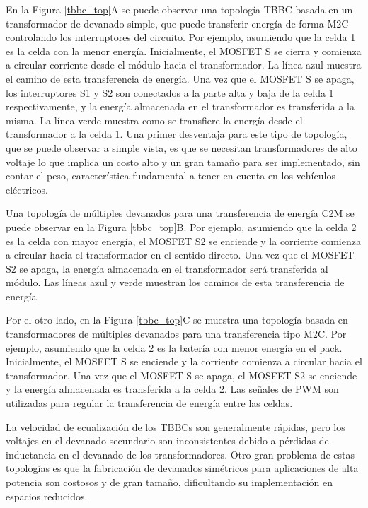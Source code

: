 En la Figura \ref{tbbc_top}A se puede observar una topolog\'ia \acrshort{TBBC}
basada en un transformador de devanado simple, que puede transferir energ\'ia de
forma \acrshort{M2C} controlando los interruptores del circuito. Por ejemplo,
asumiendo que la celda 1 es la celda con la menor energ\'ia. Inicialmente, el
MOSFET S se cierra y comienza a circular corriente desde el m\'odulo hacia el
transformador. La línea azul muestra el camino de esta transferencia de
energ\'ia. Una vez que el MOSFET S se apaga, los interruptores S1 y S2 son
conectados a la parte alta y baja de la celda 1 respectivamente, y la energ\'ia
almacenada en el transformador es transferida a la misma. La línea verde muestra
como se transfiere la energ\'ia desde el transformador a la celda 1. Una primer
desventaja para este tipo de topolog\'ia, que se puede observar a simple vista,
es que se necesitan transformadores de alto voltaje lo que implica un costo alto
y un gran tamaño para ser implementado, sin contar el peso, característica
fundamental a tener en cuenta en los vehículos eléctricos.

Una topolog\'ia de m\'ultiples devanados para una transferencia de energ\'ia
\acrshort{C2M} se puede observar en la Figura \ref{tbbc_top}B. Por ejemplo,
asumiendo que la celda 2 es la celda con mayor energ\'ia, el MOSFET S2 se
enciende y la corriente comienza a circular hacia el transformador en el sentido
directo. Una vez que el MOSFET S2 se apaga, la energ\'ia almacenada en el
transformador ser\'a transferida al m\'odulo. Las líneas azul y verde muestran
los caminos de esta transferencia de energ\'ia.

Por el otro lado, en la Figura \ref{tbbc_top}C se muestra una topolog\'ia basada
en transformadores de m\'ultiples devanados para una transferencia tipo
\acrshort{M2C}. Por ejemplo, asumiendo que la celda 2 es la bater\'ia con menor 
energ\'ia en el pack. Inicialmente, el MOSFET S se enciende y la corriente 
comienza a circular hacia el transformador. Una vez que el MOSFET S se apaga, el
MOSFET S2 se enciende y la energ\'ia almacenada es transferida a la celda 2. Las
señales de \acrshort{PWM} son utilizadas para regular la transferencia de
energ\'ia entre las celdas.

La velocidad de ecualizaci\'on de los \acrshort{TBBC}s son generalmente
r\'apidas, pero los voltajes en el devanado secundario son inconsistentes debido
a p\'erdidas de inductancia en el devanado de los transformadores. Otro gran
problema de estas topolog\'ias es que la fabricaci\'on de devanados sim\'etricos
para aplicaciones de alta potencia son costosos y de gran tamaño, dificultando
su implementaci\'on en espacios reducidos.

